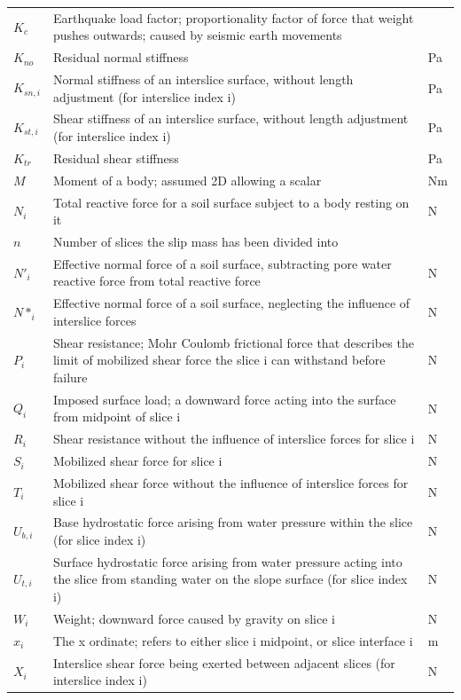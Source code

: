 \documentclass[12pt]{article}
\begin{document}
\begin{longtable*}{l l l}
$K_{c}$ & Earthquake load factor; proportionality factor of force that weight pushes outwards; caused by seismic earth movements & 
\\
$K_{no}$ & Residual normal stiffness & Pa
\\
$K_{sn,i}$ & Normal stiffness of an interslice surface, without length adjustment (for interslice index i) & Pa
\\
$K_{st,i}$ & Shear stiffness of an interslice surface, without length adjustment (for interslice index i) & Pa
\\
$K_{tr}$ & Residual shear stiffness & Pa
\\
$M$ & Moment of a body; assumed 2D allowing a scalar & Nm
\\
$N_{i}$ & Total reactive force for a soil surface subject to a body resting on it & N
\\
$n$ & Number of slices the slip mass has been divided into & 
\\
$N'_{i}$ & Effective normal force of a soil surface, subtracting pore water reactive force from total reactive force & N
\\
$N*_{i}$ & Effective normal force of a soil surface, neglecting the influence of interslice forces & N
\\
$P_{i}$ & Shear resistance; Mohr Coulomb frictional force that describes the limit of mobilized shear force the slice i can withstand before failure & N
\\
$Q_{i}$ & Imposed surface load; a downward force acting into the surface from midpoint of slice i & N
\\
$R_{i}$ & Shear resistance without the influence of interslice forces for slice i & N
\\
$S_{i}$ & Mobilized shear force for slice i & N
\\
$T_{i}$ & Mobilized shear force without the influence of interslice forces for slice i & N
\\
$U_{b,i}$ & Base hydrostatic force arising from water pressure within the slice (for slice index i) & N
\\
$U_{t,i}$ & Surface hydrostatic force arising from water pressure acting into the slice from standing water on the slope surface (for slice index i) & N
\\
$W_{i}$ & Weight; downward force caused by gravity on slice i & N
\\
$x_{i}$ & The x ordinate; refers to either slice i midpoint, or slice interface i & m
\\
$X_{i}$ & Interslice shear force being exerted between adjacent slices (for interslice index i) & N

\end{longtable*}
\end{document}
